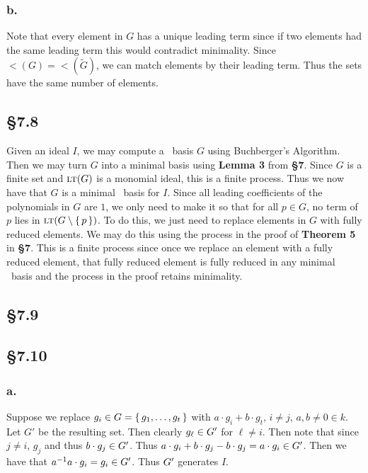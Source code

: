 \documentclass[letterpaper]{article}
\begin{document}
\subsubsection*{b.}

Note that every element in $G$ has a unique leading term since if two elements had the same leading term this would contradict minimality. Since $\lt(G) = \lt(\tilde{G})$, we can match elements by their leading term. Thus the sets have the same number of elements.

\subsection*{\S 7.8}

Given an ideal $I$, we may compute a \Grobner\ basis $G$ using Buchberger's Algorithm. Then we may turn $G$ into a minimal basis using \textbf{Lemma 3} from \textbf{\S 7}. Since $G$ is a finite set and $\gen{\lt(G)}$ is a monomial ideal, this is a finite process. Thus we now have that $G$ is a minimal \Grobner\ basis for $I$. Since all leading coefficients of the polynomials in $G$ are $1$, we only need to make it so that for all $p \in G$, no term of $p$ lies in $\gen{\lt(G \setminus \set{p})}$. To do this, we just need to replace elements in $G$ with fully reduced elements. We may do this using the process in the proof of \textbf{Theorem 5} in \textbf{\S 7}. This is a finite process since once we replace an element with a fully reduced element, that fully reduced element is fully reduced in any minimal \Grobner\ basis and the process in the proof retains minimality.

\subsection*{\S 7.9}


\subsection*{\S 7.10}

\subsubsection*{a.}

Suppose we replace $g_{i} \in G = \set{g_{1}, \ldots, g_{t}}$ with $a \cdot g_{i} + b \cdot g_{t}$, $i \neq j$, $a,b \neq 0 \in k$. Let $G'$ be the resulting set. Then clearly $g_{\ell} \in \gen{G'}$ for $\ell \neq i$. Then note that since $j \neq i$, $g_{j}$ and thus $b \cdot g_{j} \in \gen{G'}$. Thus $a \cdot g_{i} + b \cdot g_{j} - b \cdot g_{j} = a \cdot g_{i} \in \gen{G'}$. Then we have that $a^{-1} a \cdot g_{i} = g_{i} \in \gen{G'}$. Thus $\gen{G'}$ generates $I$.
\end{document}
